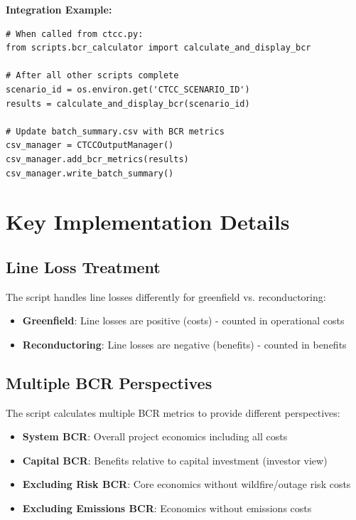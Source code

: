\documentclass[ctcc_full_documentation.tex]{subfiles}
\begin{document}
\textbf{Integration Example:}

\begin{lstlisting}
# When called from ctcc.py:
from scripts.bcr_calculator import calculate_and_display_bcr

# After all other scripts complete
scenario_id = os.environ.get('CTCC_SCENARIO_ID')
results = calculate_and_display_bcr(scenario_id)

# Update batch_summary.csv with BCR metrics
csv_manager = CTCCOutputManager()
csv_manager.add_bcr_metrics(results)
csv_manager.write_batch_summary()
\end{lstlisting}

\section{Key Implementation Details}

\subsection{Line Loss Treatment}

The script handles line losses differently for greenfield vs. reconductoring:
\begin{itemize}
    \item \textbf{Greenfield}: Line losses are positive (costs) - counted in operational costs
    \item \textbf{Reconductoring}: Line losses are negative (benefits) - counted in benefits
\end{itemize}

\subsection{Multiple BCR Perspectives}

The script calculates multiple BCR metrics to provide different perspectives:
\begin{itemize}
    \item \textbf{System BCR}: Overall project economics including all costs
    \item \textbf{Capital BCR}: Benefits relative to capital investment (investor view)
    \item \textbf{Excluding Risk BCR}: Core economics without wildfire/outage risk costs
    \item \textbf{Excluding Emissions BCR}: Economics without emissions costs
\end{itemize}
\end{document}
